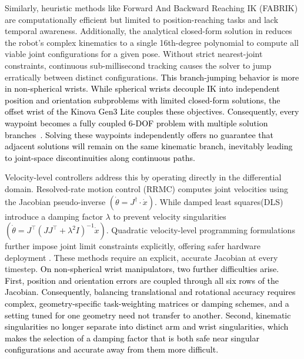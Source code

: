 \documentclass[preprint,12pt]{elsarticle}
\begin{document}
Similarly, heuristic methods like Forward And Backward Reaching IK (FABRIK) \cite{fabrik} are computationally efficient but limited to position-reaching tasks and lack temporal awareness. Additionally, the analytical closed-form solution in \cite{zohour2021kinova} reduces the robot's complex kinematics to a single 16th-degree polynomial to compute all viable joint configurations for a given pose. Without strict nearest-joint constraints, continuous sub-millisecond tracking causes the solver to jump erratically between distinct configurations. \textcolor{black}{This branch-jumping behavior is more in non-spherical wrists. While spherical wrists decouple IK into independent position and orientation subproblems with limited closed-form solutions, the offset wrist of the Kinova Gen3 Lite couples these objectives. Consequently, every waypoint becomes a fully coupled 6-DOF problem with multiple solution branches~\cite{zohour2021kinova}. Solving these waypoints independently offers no guarantee that adjacent solutions will remain on the same kinematic branch, inevitably leading to joint-space discontinuities along continuous paths.}


Velocity-level controllers address this by operating directly in the differential domain. Resolved-rate motion control (RRMC) \cite{whiteney1969resolved} computes joint velocities using the Jacobian pseudo-inverse $(\dot{\theta}=J^{\dagger}\cdot\dot{x})$. While damped least squares(DLS)\cite{DLS, chiaverini1994review} introduce a damping factor $\lambda$ to prevent velocity singularities $(\dot{\theta} = J^\top(JJ^\top + \lambda^2 I)^{-1}\dot{x})$. Quadratic velocity-level  programming formulations \cite{velocityqp} further impose joint limit constraints explicitly, offering safer hardware deployment \cite{velocityqp_2}. These methods require an explicit, accurate Jacobian at every timestep. \textcolor{black}{On non-spherical wrist manipulators, two further difficulties arise. First, position and orientation errors are coupled through all six rows of the Jacobian. Consequently, balancing translational and rotational accuracy requires complex, geometry-specific task-weighting matrices or damping schemes, and a setting tuned for one geometry need not transfer to another. Second, kinematic singularities no longer separate into distinct arm and wrist singularities, which makes the selection of a damping factor that is both safe near singular configurations and accurate away from them more difficult.}
\end{document}
